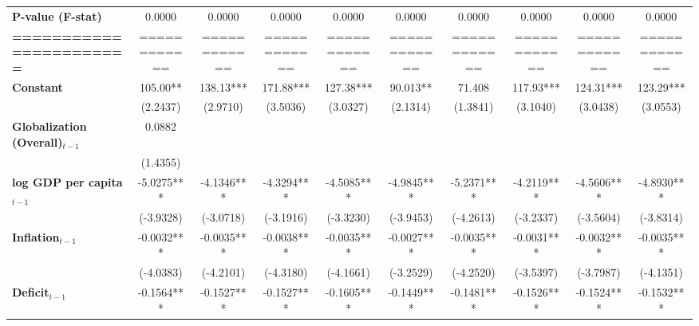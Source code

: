 \begin{center}
\begin{tabular}{lccccccccc}
\textbf{P-value (F-stat)}          &     0.0000     &      0.0000      &      0.0000      &      0.0000      &      0.0000      &      0.0000      &      0.0000      &      0.0000      &      0.0000       \\
\textbf{=======================}   &  ============  &   ============   &   ============   &   ============   &   ============   &   ============   &   ============   &   ============   &   ============    \\
\textbf{Constant}                     &    105.00**    &    138.13***     &    171.88***     &    127.38***     &     90.013**     &      71.408      &    117.93***     &    124.31***     &    123.29***      \\
\textbf{ }                         &    (2.2437)    &     (2.9710)     &     (3.5036)     &     (3.0327)     &     (2.1314)     &     (1.3841)     &     (3.1040)     &     (3.0438)     &     (3.0553)      \\
\textbf{Globalization (Overall)$_{t-1}$}               &     0.0882     &                  &                  &                  &                  &                  &                  &                  &                   \\
\textbf{ }                         &    (1.4355)    &                  &                  &                  &                  &                  &                  &                  &                   \\
\textbf{log GDP per capita$_{t-1}$}           &   -5.0275***   &    -4.1346***    &    -4.3294***    &    -4.5085***    &    -4.9845***    &    -5.2371***    &    -4.2119***    &    -4.5606***    &    -4.8930***     \\
\textbf{ }                         &   (-3.9328)    &    (-3.0718)     &    (-3.1916)     &    (-3.3230)     &    (-3.9453)     &    (-4.2613)     &    (-3.2337)     &    (-3.5604)     &    (-3.8314)      \\
\textbf{Inflation$_{t-1}$}      &   -0.0032***   &    -0.0035***    &    -0.0038***    &    -0.0035***    &    -0.0027***    &    -0.0035***    &    -0.0031***    &    -0.0032***    &    -0.0035***     \\
\textbf{ }                         &   (-4.0383)    &    (-4.2101)     &    (-4.3180)     &    (-4.1661)     &    (-3.2529)     &    (-4.2520)     &    (-3.5397)     &    (-3.7987)     &    (-4.1351)      \\
\textbf{Deficit$_{t-1}$}             &   -0.1564***   &    -0.1527***    &    -0.1527***    &    -0.1605***    &    -0.1449***    &    -0.1481***    &    -0.1526***    &    -0.1524***    &    -0.1532***     \\

\end{tabular}
\end{center}
